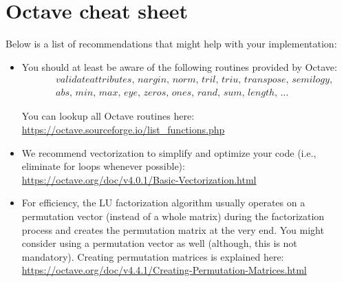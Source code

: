 \documentclass{scrartcl}
\begin{document}
\section*{Octave cheat sheet}
Below is a list of recommendations that might help with your implementation:
\begin{itemize}

\item You should at least be aware of the following routines provided by Octave:
\begin{eqnarray*}
&& validateattributes,\,nargin,\,norm,\,tril,\,triu,\,transpose,\,semilogy,\\
&& abs,\,min,\,max,\,eye,\,zeros,\,ones,\,rand,\,sum,\,length,\,\ldots 
\end{eqnarray*}

You can lookup all Octave routines here:\\
\url{https://octave.sourceforge.io/list_functions.php}

\item We recommend vectorization to simplify and optimize your code (i.e., eliminate for loops whenever possible):\vspace{.3cm}\\
\url{https://octave.org/doc/v4.0.1/Basic-Vectorization.html}

\item For efficiency, the LU factorization algorithm usually operates on a permutation vector (instead of a whole matrix) during the factorization process and creates the permutation matrix at the very end. You might consider using a permutation vector as well (although, this is not mandatory). Creating permutation matrices is explained here:\vspace{.3cm}\\
\url{https://octave.org/doc/v4.4.1/Creating-Permutation-Matrices.html}


\end{itemize}
\end{document}
